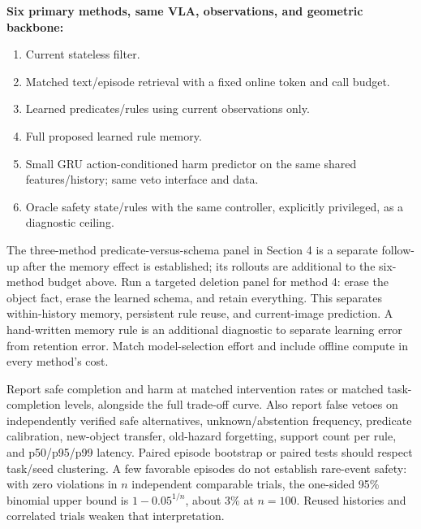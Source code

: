 \documentclass[10pt]{article}
\begin{document}
\textbf{Six primary methods, same VLA, observations, and geometric backbone:}
\begin{enumerate}
\item Current stateless filter.
\item Matched text/episode retrieval with a fixed online token and call budget.
\item Learned predicates/rules using current observations only.
\item Full proposed learned rule memory.
\item Small GRU action-conditioned harm predictor on the same shared features/history; same veto interface and data.
\item Oracle safety state/rules with the same controller, explicitly privileged, as a diagnostic ceiling.
\end{enumerate}

The three-method predicate-versus-schema panel in Section 4 is a separate follow-up after the memory effect is established; its rollouts are additional to the six-method budget above. Run a targeted deletion panel for method 4: erase the object fact, erase the learned schema, and retain everything. This separates within-history memory, persistent rule reuse, and current-image prediction. A hand-written memory rule is an additional diagnostic to separate learning error from retention error. Match model-selection effort and include offline compute in every method's cost.

Report safe completion and harm at matched intervention rates or matched task-completion levels, alongside the full trade-off curve. Also report false vetoes on independently verified safe alternatives, unknown/abstention frequency, predicate calibration, new-object transfer, old-hazard forgetting, support count per rule, and p50/p95/p99 latency. Paired episode bootstrap or paired tests should respect task/seed clustering. A few favorable episodes do not establish rare-event safety: with zero violations in $n$ independent comparable trials, the one-sided 95\% binomial upper bound is $1-0.05^{1/n}$, about 3\% at $n=100$. Reused histories and correlated trials weaken that interpretation.
\end{document}
